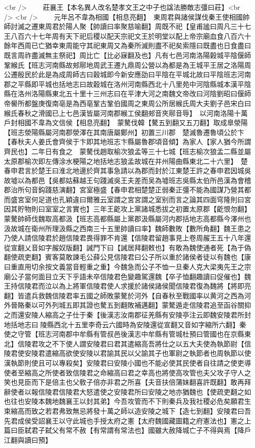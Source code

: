 <br />
　　莊襄王【本名異人改名楚孝文王之中子也諡法勝敵志彊曰莊】<br />
<br />
　　元年呂不韋為相國【相息亮翻】　東周君與諸侯謀伐秦王使相國帥師討滅之遷東周君於陽人聚【帥讀曰率聚慈喻翻】周既不祀【皇甫謐曰周凡三十七王八百六十七年周有天下祀后稷以配天宗祀文王於明堂以配上帝宗廟血食八百六十餘年西周已亡猶幸東周能守其祀東周又為秦所滅則盡不祀矣索隱曰既盡也日食盡曰既言周祚盡滅無主祭祀】周比亡【比必寐翻及也】凡有七邑河南洛陽穀城平陰偃師鞏緱氏【班志河南縣故郟鄏地周武王遷九鼎周公營以為都是為王城平王居之洛陽周公遷殷民於此是為成周師古曰穀城即今新安應劭曰平陰在平城北故曰平陰班志河南郡之平縣即平城也括地志曰故穀城在洛州河南縣西北十八里苑中河陰縣城本漢平陰縣在洛州洛陽縣東北五十里十三州志曰在平津大河之南魏文帝改曰河陰劉昭曰偃師帝嚳所都盤庚復南亳是為西亳鞏古鞏伯國周之東周公所居緱氏周大夫劉子邑宋白曰緱氏春秋之滑國已上七邑漢皆屬河南郡緱工侯翻郟音夾鄏音辱】　以河南洛陽十萬戶封相國不韋為文信侯【相息亮翻】　蒙驁伐韓【驁五到翻又五刀翻】取成臯滎陽【班志滎陽縣屬河南郡滎澤在其南唐屬鄭州】初置三川郡　楚滅魯遷魯頃公於卞【春秋夫人姜氏會齊侯于卞即其地班志卞縣屬魯郡頃音傾】為家人【家人猶今所謂齊民也】二年日有食之　蒙驁伐趙取榆次狼孟等三十七城【班志榆次狼孟二縣並屬太原郡榆次即左傳涂水梗陽之地括地志狼孟故城在并州陽曲縣東北二十六里】　楚春申君言於楚王曰淮北地邊於齊其事急請以為郡而封於江東楚王許之春申君因城吳故墟以為都邑【吳都姑蘇越王句踐滅吳王夫差而吴為墟班志吳縣太伯所邑漢為會稽郡治所句音鈎踐慈演翻】宮室極盛【春申君相楚楚正弱秦正彊不能為國謀乃營其都而盛宮室何足道也孔穎違曰爾雅云室謂之宮宮謂之室别而言之論其四面穹隆則曰宮因其貯物則曰室室之言實也】三年王齕攻上黨諸城悉拔之初置太原郡【齕恨勿翻】　蒙驁帥師伐魏取高都汲【班志高都縣屬上黨郡汲縣屬河内郡括地志高都縣今澤州也汲故城在衛州所理汲縣之西南三十五里帥讀曰率】魏師數敗【數所角翻】魏王患之乃使人請信陵君於趙信陵君畏得罪不肯還【信陵君留趙事見上卷周赧王五十八年還從宣翻乂音如字赧奴版翻】誡門下曰【誡居拜翻敕也】有敢為魏使通者死【為于偽翻使疏吏翻】賓客莫敢諫毛公薛公見信陵君曰公子所以重於諸侯者徒以有魏也【康曰重直用切余按文義當音輕重之重】今魏急而公子不恤一旦秦人克大梁夷先王之宗廟公子當何面目立天下乎語未卒信陵君色變趣駕還魏【卒子恤翻趣讀曰促催也】魏王持信陵君而泣以為上將軍信陵君使人求援於諸侯諸侯聞信陵君復為魏將【將即亮翻】皆遣兵救魏信陵君率五國之師敗蒙驁於河外【自春秋至戰國率以黄河之西為河外晉賂秦以可外列城五即其證也驁五到翻敗補邁翻】蒙驁遁走信陵君追至函谷關抑之而還安陵人縮高之子仕于秦【後漢志汝南郡征羌縣有安陵亭注云即魏安陵君所封地括地志曰陵縣西北十五里李奇云六國時為安陵還從宣翻又音如字縮所六翻】秦使之守管【班志河南郡中牟縣有管叔邑後漢志中牟縣有管城杜預曰管國也在京縣東北】信陵君攻之不下使人謂安陵君曰君其遣縮高吾將仕之以五大夫使為執節尉【信陵君使安陵君遣縮高欲使安陵以君諭其民以父諭其子也軍尉之執節者也周執節以使漢執節則使且可以專殺矣】安陵君曰安陵小國也不能必使其民使者自往請之使吏導使者至縮高之所使者致信陵君之命縮高曰君之幸高也將使高攻管也夫父攻子守人之笑也見臣而下是倍主也父敎子倍亦非君之所喜【夫音扶倍蒲妹翻喜許既翻】敢再拜辭使者以報信陵君信陵君大怒遣使之安陵君所曰安陵之地亦猶魏也【使疏吏翻之如也往也安陵本魏地魏襄王以封其弟】今吾攻管而不下則秦兵及我社稷必危矣願君生束縮高而致之若君弗致無忌將發十萬之師以造安陵之城下【造七到翻】安陵君曰吾先君成侯受詔襄王以守此城也手授太府之憲【太府魏國藏圖籍之府憲法也】憲之上篇曰臣弑君子弑父有常不赦【有常謂有常法也】國雖大赦降城亡子不得與焉【降戶江翻與讀曰預】